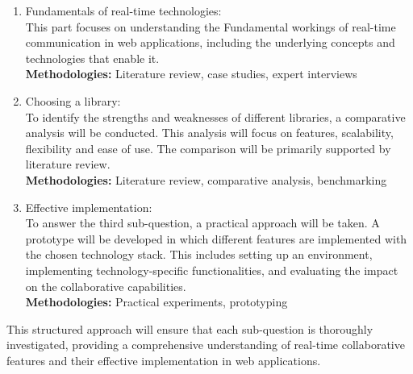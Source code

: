 \begin{enumerate}
    \item Fundamentals of real-time technologies: \\ This part focuses on understanding the Fundamental workings of real-time communication in web applications, including the underlying concepts and technologies that enable it. \\ \textbf{Methodologies:} Literature review, case studies, expert interviews
    \item Choosing a library: \\ To identify the strengths and weaknesses of different libraries, a comparative analysis will be conducted. This analysis will focus on features, scalability, flexibility and ease of use. The comparison will be primarily supported by literature review. \\ \textbf{Methodologies:} Literature review, comparative analysis, benchmarking
    \item Effective implementation: \\ To answer the third sub-question, a practical approach will be taken. A prototype will be developed in which different features are implemented with the chosen technology stack. This includes setting up an environment, implementing technology-specific functionalities, and evaluating the impact on the collaborative capabilities. \\ \textbf{Methodologies:} Practical experiments, prototyping
\end{enumerate}

This structured approach will ensure that each sub-question is thoroughly investigated, providing a comprehensive understanding of real-time collaborative features and their effective implementation in web applications.
